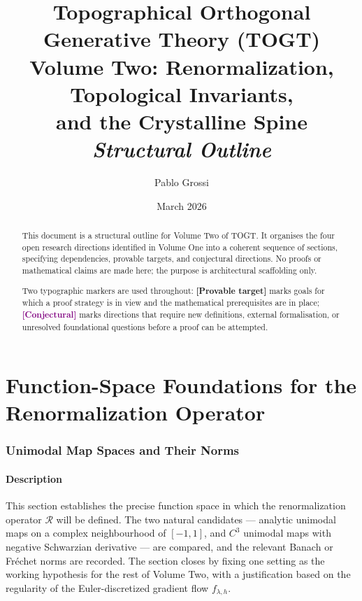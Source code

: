 \documentclass[11pt]{article}
\title{Topographical Orthogonal Generative Theory (TOGT)\\[4pt]
\large Volume Two: Renormalization, Topological Invariants,\\
and the Crystalline Spine\\[6pt]
\normalsize \emph{Structural Outline}}
\author{Pablo Grossi}
\date{March 2026}
\newcommand{\provable}{\textcolor{blue!70!black}{\textbf{[Provable target]}}}
\newcommand{\conjectural}{\textcolor{purple}{\textbf{[Conjectural]}}}
\begin{document}
\maketitle

\begin{abstract}
This document is a structural outline for Volume Two of TOGT. It organises
the four open research directions identified in Volume One into a coherent
sequence of sections, specifying dependencies, provable targets, and
conjectural directions. No proofs or mathematical claims are made here;
the purpose is architectural scaffolding only.

Two typographic markers are used throughout:
\provable{} marks goals for which a proof strategy is in view and the
mathematical prerequisites are in place;
\conjectural{} marks directions that require new definitions, external
formalisation, or unresolved foundational questions before a proof can be
attempted.
\end{abstract}

\tableofcontents
\bigskip

\part{Function-Space Foundations for the Renormalization Operator}

\section{Unimodal Map Spaces and Their Norms}

\subsection*{Description}
This section establishes the precise function space in which the
renormalization operator $\mathcal{R}$ will be defined. The two natural
candidates --- analytic unimodal maps on a complex neighbourhood of
$[-1,1]$, and $C^3$ unimodal maps with negative Schwarzian derivative ---
are compared, and the relevant Banach or Fr\'{e}chet norms are recorded.
The section closes by fixing one setting as the working hypothesis for the
rest of Volume Two, with a justification based on the regularity of the
Euler-discretized gradient flow $f_{\lambda,h}$.
\end{document}
